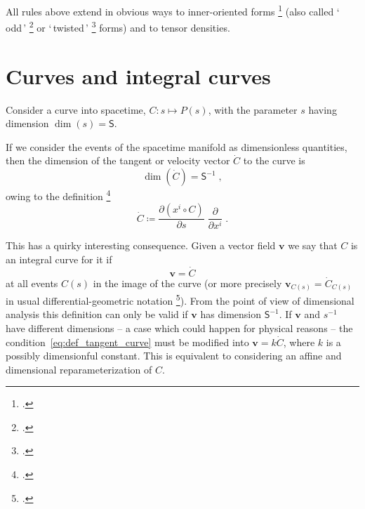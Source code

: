 \documentclass[a4paper,12pt,onecolumn,oneside,article,british]{memoir}
\newcommand*{\defquote}[1]{`\,#1\,'}
\newcommand*{\citep}{\footcites}
\newcommand*{\de}{\partial}%
\newcommand*{\defd}{\coloneqq}
\newcommand*{\sect}{\S}%
\newcommand*{\chap}{ch.}%
\newcommand*{\Ss}{\textsf{S}}
\newcommand*{\yv}{\bm{v}}
\newcommand*{\dex}[1][i]{\frac{\de}{\de x^{#1}}}
\begin{document}
All rules above extend in obvious ways to inner-oriented forms
\citep[\chap~II]{schouten1951_r1989} (also called \defquote{odd}
\citep[\chap~II]{derham1955_t1984} or \defquote{twisted}
\citep{burke1983,burke1995}[\chap~3]{bossavit1991} forms) and to tensor densities.


\section{Curves and integral curves}
\label{sec:curves}


Consider a curve into spacetime, $C\colon s \mapsto P(s)$, with the
parameter $s$ having dimension $\dim(s)=\Ss$.


If we consider the events of the spacetime manifold as dimensionless
quantities, then the dimension of the tangent or velocity vector $\dot{C}$
to the curve is
\begin{equation}
  \label{eq:dim_velocity}
  \dim(\dot{C}) = \Ss^{-1} \;,
\end{equation}
owing to the definition
\citep[\sect~III.B.1]{choquetbruhatetal1977_r1996}[\sect~IV.(1.9)]{boothby1975_r2003}
\begin{equation}
  \label{eq:def_tangent_curve}
\dot{C} \defd \frac{\de (x^{i} \circ C)}{\de s}\;\dex \;.
\end{equation}

This has a quirky  interesting consequence. Given a vector field $\yv$
we say that $C$ is an integral curve for it if
\begin{equation}
  \yv = \dot{C}
  \label{eq:integral_curve}
\end{equation}
at all events $C(s)$ in the image of the curve (or more precisely
$\yv_{C(s)} = \dot{C}_{C(s)}$ in usual differential-geometric notation
\citep[\sect~III.B.1]{choquetbruhatetal1977_r1996}). From the point of view
of dimensional analysis this definition can only be valid if $\yv$ has
dimension $\Ss^{-1}$. If $\yv$ and $s^{-1}$ have different dimensions -- a
case which could happen for physical reasons -- the
condition~\eqref{eq:def_tangent_curve} must be modified into
$\yv = k\dot{C}$, where $k$ is a possibly dimensionful constant. This is
equivalent to considering an affine and dimensional reparameterization of
$C$.

\end{document}
